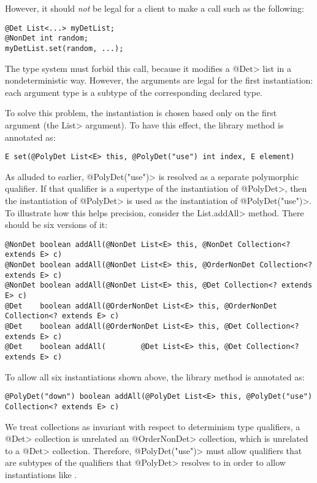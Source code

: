 \noindent
However, it should \emph{not} be legal for a client to make a call such as
the following:

\begin{Verbatim}
@Det List<...> myDetList;
@NonDet int random;
myDetList.set(random, ...);
\end{Verbatim}

\noindent
The type system must forbid this call, because it modifies a
\<@Det> list in a nondeterministic way.
However, the arguments are legal for the first instantiation:
each argument type is a subtype of the corresponding declared type.

To solve this problem, the instantiation is chosen based only on the first
argument (the \<List> argument).  To have this effect, the library method
is annotated as:

\begin{Verbatim}
E set(@PolyDet List<E> this, @PolyDet("use") int index, E element)
\end{Verbatim}

As alluded to earlier, \<@PolyDet("use")> is resolved as a
separate polymorphic qualifier. If that qualifier is a supertype
of the instantiation of \<@PolyDet>, then the instantiation of \<@PolyDet>
is used as the instantiation of \<@PolyDet("use")>.
To illustrate how this helps precision,
consider the \<List.addAll> method. There should be six versions of it:

\begin{Verbatim}
@NonDet boolean addAll(@NonDet List<E> this, @NonDet Collection<? extends E> c)
@NonDet boolean addAll(@NonDet List<E> this, @OrderNonDet Collection<? extends E> c)
@NonDet boolean addAll(@NonDet List<E> this, @Det Collection<? extends E> c)
@Det    boolean addAll(@OrderNonDet List<E> this, @OrderNonDet Collection<? extends E> c)
@Det    boolean addAll(@OrderNonDet List<E> this, @Det Collection<? extends E> c)
@Det    boolean addAll(        @Det List<E> this, @Det Collection<? extends E> c)
\end{Verbatim}

To allow all six instantiations shown above, the library method
is annotated as:

\begin{Verbatim}
@PolyDet("down") boolean addAll(@PolyDet List<E> this, @PolyDet("use") Collection<? extends E> c)
\end{Verbatim}
We treat collections as invariant with respect to determinism type qualifiers,
a \<@Det> collection is unrelated an \<@OrderNonDet> collection, which is unrelated
to a \<@Det> collection. Therefore, \<@PolyDet("use")> must allow qualifiers that
are subtypes of the qualifiers that \<@PolyDet> resolves to in order to allow
instantiations like .

